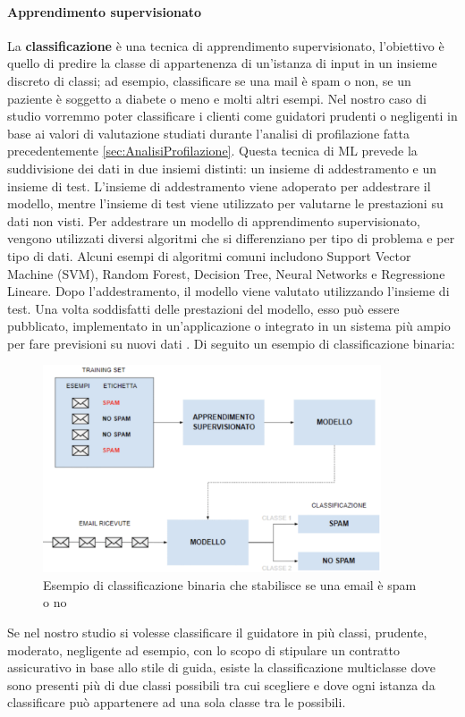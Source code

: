 \documentclass[12pt, a4paper, italian]{report}
\numberwithin{figure}{chapter}
\numberwithin{table}{chapter}
\begin{document}
\paragraph{Apprendimento supervisionato}
La \textbf{classificazione} è una tecnica di apprendimento supervisionato, l'obiettivo è quello di predire la classe di appartenenza di un'istanza di input in un insieme discreto di classi; ad esempio, classificare se una mail è spam o non, se un paziente è soggetto a diabete o meno e molti altri esempi. Nel nostro caso di studio vorremmo poter classificare i clienti come guidatori prudenti o negligenti in base ai valori di valutazione studiati durante l'analisi di profilazione fatta precedentemente \ref{sec:AnalisiProfilazione}. Questa tecnica di ML prevede la suddivisione dei dati in due insiemi distinti: un insieme di addestramento e un insieme di test. L'insieme di addestramento viene adoperato per addestrare il modello, mentre l'insieme di test viene utilizzato per valutarne le prestazioni su dati non visti. Per addestrare un modello di apprendimento supervisionato, vengono utilizzati diversi algoritmi che si differenziano per tipo di problema e per tipo di dati. Alcuni esempi di algoritmi comuni includono Support Vector Machine (SVM), Random Forest, Decision Tree, Neural Networks e Regressione Lineare. Dopo l'addestramento, il modello viene valutato utilizzando l'insieme di test. Una volta soddisfatti delle prestazioni del modello, esso può essere pubblicato, implementato in un'applicazione o integrato in un sistema più ampio per fare previsioni su nuovi dati \cite{muhammad2015supervised}. Di seguito un esempio di classificazione binaria: 

\begin{figure}[h] \centering
\includegraphics[width=10cm]{Classificazione.png}
\caption{Esempio di classificazione binaria che stabilisce se una email è spam o no\protect\footnotemark}
\label{fig:Classificazione binaria}
\end{figure}
Se nel nostro studio si volesse classificare il guidatore in più classi, prudente, moderato, negligente ad esempio, con lo scopo di stipulare un contratto assicurativo in base allo stile di guida, esiste la classificazione multiclasse dove sono presenti più di due classi possibili tra cui scegliere e dove ogni istanza da classificare può appartenere ad una sola classe tra le possibili.
\end{document}
